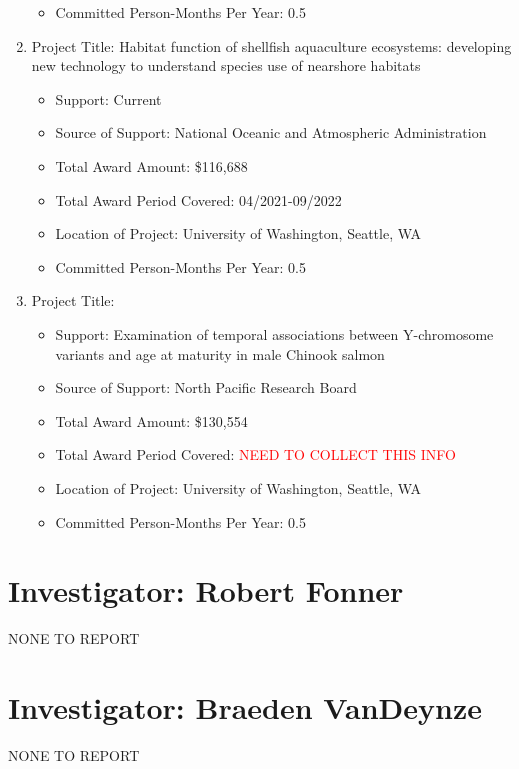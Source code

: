 \documentclass[12pt]{elsarticle}
\begin{document}
\begin{enumerate}
\begin{itemize}
\item Committed Person-Months Per Year: 0.5
\end{itemize}
\item Project Title: Habitat function of shellfish aquaculture ecosystems: developing new technology to understand species use of nearshore habitats
\begin{itemize}
\item Support: Current
\item Source of Support: National Oceanic and Atmospheric Administration
\item Total Award Amount: \$116,688
\item Total Award Period Covered: 04/2021-09/2022
\item Location of Project: University of Washington, Seattle, WA
\item Committed Person-Months Per Year: 0.5
\end{itemize}
\item Project Title: 
\begin{itemize}
\item Support: Examination of temporal associations between Y-chromosome variants and age at maturity in male Chinook salmon
\item Source of Support: North Pacific Research Board
\item Total Award Amount: \$130,554
\item Total Award Period Covered: \textcolor{red}{NEED TO COLLECT THIS INFO}
\item Location of Project: University of Washington, Seattle, WA
\item Committed Person-Months Per Year: 0.5
\end{itemize}
\end{enumerate}

\section*{Investigator: Robert Fonner}

\noindent NONE TO REPORT

\section*{Investigator: Braeden VanDeynze}

\noindent NONE TO REPORT
\end{document}
